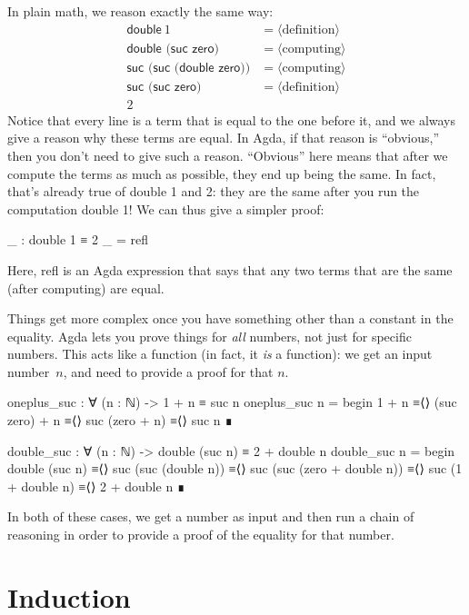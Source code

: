 \documentclass{lecturenotes}
\begin{document}
In plain math, we reason exactly the same way:
$$
\begin{array}{ll}
  \textsf{double}~1 &= \langle\text{definition}\rangle\\
  \textsf{double (suc zero)} &= \langle\text{computing}\rangle\\
  \textsf{suc (suc (double zero))} &= \langle\text{computing}\rangle\\
  \textsf{suc (suc zero)} &= \langle\text{definition}\rangle\\
  2
\end{array}
$$
Notice that every line is a term that is equal to the one before it, and we always give a reason why these terms are equal.
In Agda, if that reason is ``obvious,'' then you don't need to give such a reason.
``Obvious'' here means that after we compute the terms as much as possible, they end up being the same.
In fact, that's already true of \textsf{double 1} and \textsf{2}: they are the same after you run the computation \textsf{double 1}!
We can thus give a simpler proof:
\begin{center}
\begin{code}
  _ : double 1 ≡ 2
  _ = refl
\end{code}
\end{center}
Here, \textsf{refl} is an Agda expression that says that any two terms that are the same (after computing) are equal.

\pagebreak
Things get more complex once you have something other than a constant in the equality.
Agda lets you prove things for \emph{all} numbers, not just for specific numbers.
This acts like a function (in fact, it \emph{is} a function): we get an input number~$n$, and need to provide a proof for that $n$.
\begin{center}
\begin{code}
  oneplus_suc : ∀ (n : ℕ) -> 1 + n ≡ suc n
  oneplus_suc n =
    begin
      1 + n
    ≡⟨⟩
      (suc zero) + n
    ≡⟨⟩
      suc (zero + n)
    ≡⟨⟩
      suc n
      ∎

  double_suc : ∀ (n : ℕ) -> double (suc n) ≡ 2 + double n
  double_suc n =
    begin
      double (suc n)
    ≡⟨⟩
      suc (suc (double n))
    ≡⟨⟩
      suc (suc (zero + double n))
    ≡⟨⟩
      suc (1 + double n)
    ≡⟨⟩
      2 + double n
    ∎
\end{code}
\end{center}
In both of these cases, we get a number as input and then run a chain of reasoning in order to provide a proof of the equality for that number.

\section{Induction}
\label{sec:induction}
\end{document}
